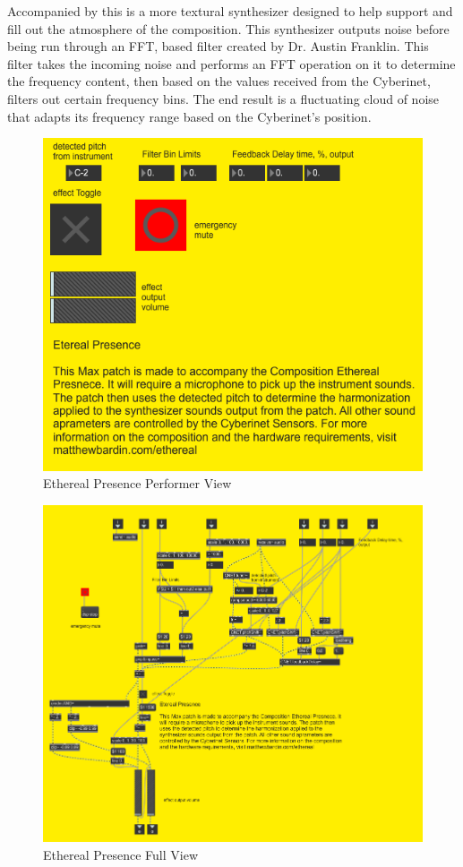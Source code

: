 Accompanied by this is a more textural synthesizer designed to help support and fill out the atmosphere of the composition. This synthesizer outputs noise before being run through an FFT, based filter created by Dr. Austin Franklin. This filter takes the incoming noise and performs an FFT operation on it to determine the frequency content, then based on the values received from the Cyberinet, filters out certain frequency bins. The end result is a fluctuating cloud of noise that adapts its frequency range based on the Cyberinet's position.


\begin{figure}
    \centering
    \includegraphics{diagrams/maxPatches/ethereal_pres.png}
    \caption{Ethereal Presence Performer View}
    \label{fig:etherealPerf}
\end{figure}

\begin{figure}
    \centering
    \includegraphics[scale=0.75]{diagrams/maxPatches/ethereal_raw.png}
    \caption{Ethereal Presence Full View}
    \label{fig:etherealRaw}
\end{figure}


